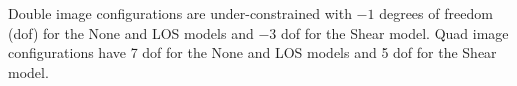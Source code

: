 Double image configurations are under-constrained with $-1$ degrees of freedom (dof) for the None and LOS models and $-3$ dof for the Shear model. Quad image configurations have 7 dof for the None and LOS models and 5 dof for the Shear model.